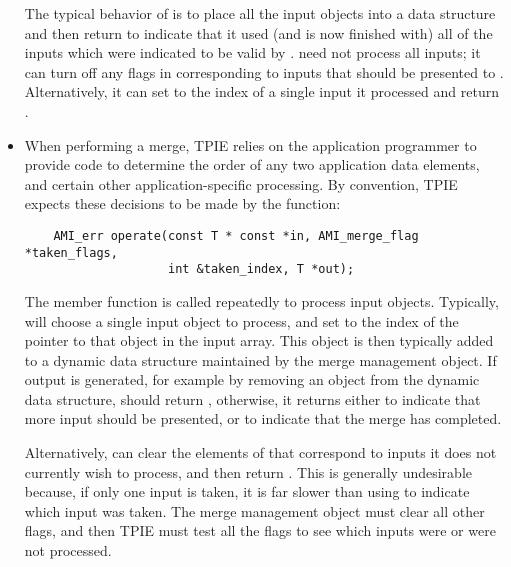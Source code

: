 \begin{itemize}
    The typical behavior of  is to
    place all the input objects into a data structure and
    then return  to
    indicate that it used (and is now finished with) all of
    the inputs which were indicated to be valid by
    .   need not
    process all inputs; it can turn off any flags in
     corresponding to inputs that
    should be presented to .
    Alternatively, it can set  to the
    index of a single input it processed and return
    .
    \item {}
    When performing a merge, TPIE relies on the application
    programmer to provide code to determine the order of any
    two application data elements, and certain other
    application-specific processing. By convention, TPIE
    expects these decisions to be made by the
     function:
\begin{verbatim}
    AMI_err operate(const T * const *in, AMI_merge_flag *taken_flags,
                    int &taken_index, T *out);
\end{verbatim}
    The  member function is called
    repeatedly to process input objects.  Typically,
     will choose a single input object to
    process, and set  to the index of
    the pointer to that object in the input array.  This
    object is then typically added to a dynamic data
    structure maintained by the merge management object.  If
    output is generated, for example by removing an object
    from the dynamic data structure, 
    should return , otherwise, it
    returns either  to indicate
    that more input should be presented, or
     to indicate that the merge has
    completed.
    
    Alternatively,  can clear the elements
    of  that correspond to inputs it
    does not currently wish to process, and then return
    .  This is generally
    undesirable because, if only one input is taken, it is
    far slower than using  to indicate
    which input was taken.  The merge management object must
    clear all other flags, and then TPIE must test all the
    flags to see which inputs were or were not processed.
\end{itemize}

